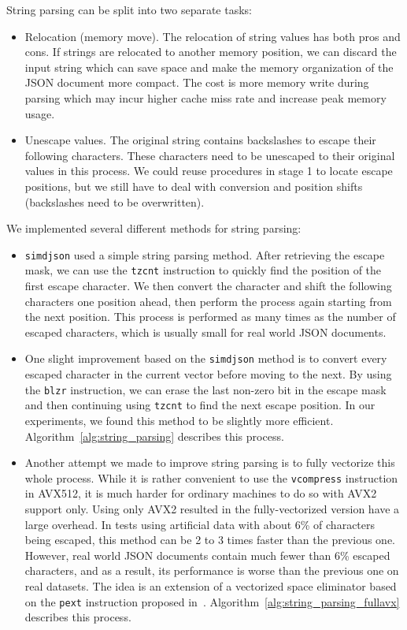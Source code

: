 \documentclass[11pt]{article}
\begin{document}
String parsing can be split into two separate tasks:
\begin{itemize}
    \item Relocation (memory move). The relocation of string values has both pros and cons. If strings are relocated to another memory position, we can discard the input string which can save space and make the memory organization of the JSON document more compact. The cost is more memory write during parsing which may incur higher cache miss rate and increase peak memory usage.
    \item Unescape values. The original string contains backslashes to escape their following characters. These characters need to be unescaped to their original values in this process. We could reuse procedures in stage 1 to locate escape positions, but we still have to deal with conversion and position shifts (backslashes need to be overwritten).
\end{itemize}

We implemented several different methods for string parsing:
\begin{itemize}
    \item \texttt{simdjson} used a simple string parsing method. After retrieving the escape mask, we can use the \texttt{tzcnt} instruction to quickly find the position of the first escape character. We then convert the character and shift the following characters one position ahead, then perform the process again starting from the next position. This process is performed as many times as the number of escaped characters, which is usually small for real world JSON documents.
    \item One slight improvement based on the \texttt{simdjson} method is to convert every escaped character in the current vector before moving to the next. By using the \texttt{blzr} instruction, we can erase the last non-zero bit in the escape mask and then continuing using \texttt{tzcnt} to find the next escape position. In our experiments, we found this method to be slightly more efficient. Algorithm~\ref{alg:string_parsing} describes this process.
    \item Another attempt we made to improve string parsing is to fully vectorize this whole process. While it is rather convenient to use the \texttt{vcompress} instruction in AVX512, it is much harder for ordinary machines to do so with AVX2 support only. Using only AVX2 resulted in the fully-vectorized version have a large overhead. In tests using artificial data with about 6\% of characters being escaped, this method can be 2 to 3 times faster than the previous one. However, real world JSON documents contain much fewer than 6\% escaped characters, and as a result, its performance is worse than the previous one on real datasets. The idea is an extension of a vectorized space eliminator based on the \texttt{pext} instruction proposed in~\cite{lemiredespace}. Algorithm~\ref{alg:string_parsing_fullavx} describes this process.
\end{itemize}
\end{document}
